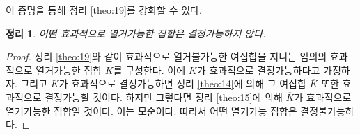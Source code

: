 \documentclass[a4paper,chapter,atbegshi]{oblivoir}
\newtheorem{theo}{정리}[chapter]
\begin{document}
이 증명을 통해 정리 \ref{theo:19}를 강화할 수 있다.
\begin{theo}
  어떤 효과적으로 열거가능한 집합은 결정가능하지 않다.
\end{theo}
\begin{proof}
  정리 \ref{theo:19}와 같이 효과적으로 열거불가능한 여집합을 지니는 임의의
  효과적으로 열거가능한 집합 $K$를 구성한다. 이에 $K$가 효과적으로 결정가능하다고
  가정하자. 그리고 $K$가 효과적으로 결정가능하면 정리 \ref{theo:14}에 의해
  그 여집합 $\overline{K}$ 또한 효과적으로 결정가능할 것이다. 하지만 그렇다면
  정리 \ref{theo:15}에 의해 $\overline{K}$가 효과적으로 열거가능한 집합일 것이다.
  이는 모순이다. 따라서 어떤 열거가능 집합은 결정불가능하다.
\end{proof}
\end{document}
